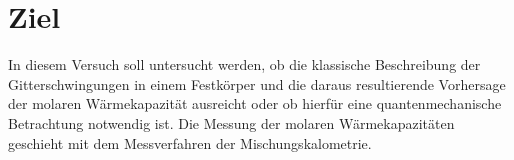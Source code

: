 \section{Ziel}
\label{sec:Ziel}
In diesem Versuch soll untersucht werden, ob die klassische Beschreibung der
Gitterschwingungen in einem Festkörper und die daraus resultierende Vorhersage
der molaren Wärmekapazität ausreicht oder ob hierfür eine quantenmechanische Betrachtung
notwendig ist. Die Messung der molaren Wärmekapazitäten geschieht mit dem Messverfahren
der Mischungskalometrie.
